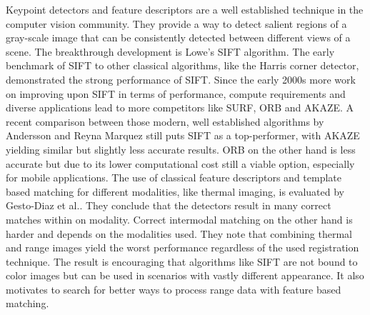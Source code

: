 Keypoint detectors and feature descriptors are a well established technique in the computer vision community.
They provide a way to detect salient regions of a gray-scale image that can be consistently detected between different views of a scene.
The breakthrough development is Lowe's SIFT\cite{lowe_ijcv04} algorithm.
The early benchmark\cite{mikolajczyk_pami2005} of SIFT to other classical algorithms, like the Harris corner detector\cite{harris_1988}, demonstrated the strong performance of SIFT.
Since the early 2000s more work on improving upon SIFT in terms of performance, compute requirements and diverse applications lead to more competitors like SURF\cite{bay_eccv06}, ORB\cite{rublee_iccv11} and AKAZE\cite{alcantarilla_bmva13}.
A recent comparison between those modern, well established algorithms by Andersson and Reyna Marquez\cite{andersson_2016} still puts SIFT as a top-performer, with AKAZE\cite{alcantarilla_bmva13} yielding similar but slightly less accurate results.
ORB\cite{rublee_iccv11} on the other hand is less accurate but due to its lower computational cost still a viable option, especially for mobile applications.
The use of classical feature descriptors and template based matching for different modalities, like thermal imaging, is evaluated by Gesto-Diaz et al.\cite{gesto-diaz_2017}.
They conclude that the detectors result in many correct matches within on modality.
Correct intermodal matching on the other hand is harder and depends on the modalities used.
They note that combining thermal and range images yield the worst performance regardless of the used registration technique.
The result is encouraging that algorithms like SIFT\cite{lowe_ijcv04} are not bound to color images but can be used in scenarios with vastly different appearance.
It also motivates to search for better ways to process range data with feature based matching.
